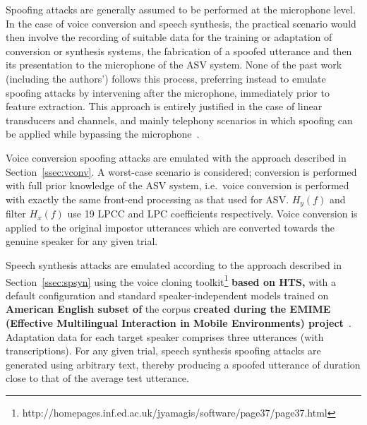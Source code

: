 
Spoofing attacks are generally assumed to be performed at the microphone level.
In the case of voice conversion and speech synthesis, the practical scenario would then involve the recording of suitable data for the training or adaptation of conversion or synthesis systems, the fabrication of a spoofed utterance and then its presentation to the microphone of the ASV system.
None of the past work (including the authors') follows this process, preferring instead to emulate spoofing attacks by intervening after the microphone, immediately prior to feature extraction.
This approach is entirely justified in the case of linear transducers and channels, and mainly telephony scenarios in which spoofing can be applied while bypassing the microphone~\cite{handbookChapter}.

Voice conversion spoofing attacks are emulated with the approach described in Section~\ref{ssec:vconv}. 
A worst-case scenario is considered; conversion is performed with full prior knowledge of the ASV system, i.e.\ voice conversion is performed with exactly the same front-end processing as that used for ASV.
$H_y(f)$ and filter $H_x(f)$ use 19 LPCC and LPC coefficients respectively.
Voice conversion is applied to the original impostor utterances which are converted towards the genuine speaker for any given trial.

Speech synthesis attacks are emulated according to the approach described in Section~\ref{ssec:spsyn} using the voice cloning toolkit\footnote{http://homepages.inf.ed.ac.uk/jyamagis/software/page37/page37.html} {\bfseries based on HTS,} with a default configuration and standard speaker-independent models trained on {\bfseries American English subset of } the corpus {\bfseries created during the EMIME (Effective Multilingual Interaction in Mobile Environments) project}~\cite{Wester2010}.   
Adaptation data for each target speaker comprises three utterances (with transcriptions).  
For any given trial, speech synthesis spoofing attacks are generated using arbitrary text, thereby producing a spoofed utterance of duration close to that of the average test utterance.

